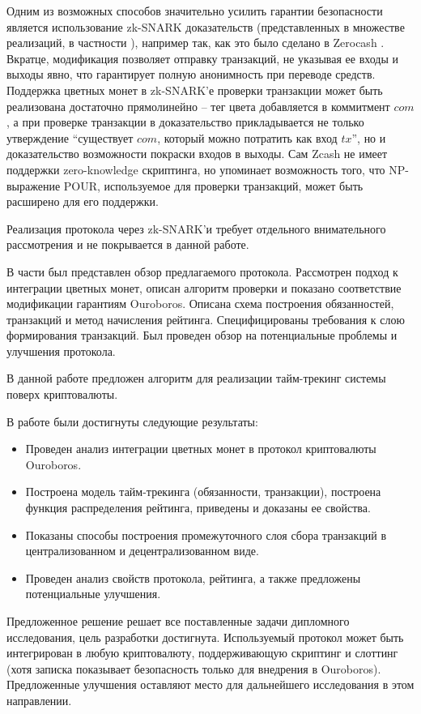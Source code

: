 \documentclass[specification,annotation]{itmo-student-thesis}
\begin{document}
Одним из возможных способов значительно усилить гарантии безопасности
является использование zk-SNARK доказательств (представленных в
множестве реализаций, в частности \cite{gennaro2013quadratic}),
например так, как это было сделано в Zerocash
\cite{zerocash}. Вкратце, модификация позволяет отправку транзакций,
не указывая ее входы и выходы явно, что гарантирует полную анонимность
при переводе средств. Поддержка цветных монет в zk-SNARK'е проверки
транзакции может быть реализована достаточно прямолинейно -- тег цвета
добавляется в коммитмент $com$, а при проверке транзакции в
доказательство прикладывается не только утверждение ``существует
$com$, который можно потратить как вход $tx$'', но и доказательство
возможности покраски входов в выходы. Сам Zcash не имеет поддержки
zero-knowledge скриптинга, но \cite{zerocash} упоминает возможность
того, что NP-выражение POUR, используемое для проверки транзакций,
может быть расширено для его поддержки.

Реализация протокола через zk-SNARK'и требует отдельного внимательного
рассмотрения и не покрывается в данной работе.

\chapterconclusion

В части был представлен обзор предлагаемого протокола. Рассмотрен
подход к интеграции цветных монет, описан алгоритм проверки и показано
соответствие модификации гарантиям Ouroboros. Описана схема построения
обязанностей, транзакций и метод начисления рейтинга. Специфицированы
требования к слою формирования транзакций. Был проведен обзор на
потенциальные проблемы и улучшения протокола.

\startconclusionpage

В данной работе предложен алгоритм для реализации тайм-трекинг системы
поверх криптовалюты.

В работе были достигнуты следующие результаты:
\begin{itemize}
\item Проведен анализ интеграции цветных монет в протокол криптовалюты
  Ouroboros.
\item Построена модель тайм-трекинга (обязанности, транзакции),
  построена функция распределения рейтинга, приведены и доказаны ее
  свойства.
\item Показаны способы построения промежуточного слоя сбора транзакций
  в централизованном и децентрализованном виде.
\item Проведен анализ свойств протокола, рейтинга, а также предложены
  потенциальные улучшения.
\end{itemize}

Предложенное решение решает все поставленные задачи дипломного
исследования, цель разработки достигнута. Используемый протокол может
быть интегрирован в любую криптовалюту, поддерживающую скриптинг и
слоттинг (хотя записка показывает безопасность только для внедрения в
Ouroboros). Предложенные улучшения оставляют место для дальнейшего
исследования в этом направлении.

\printmainbibliography
\end{document}
